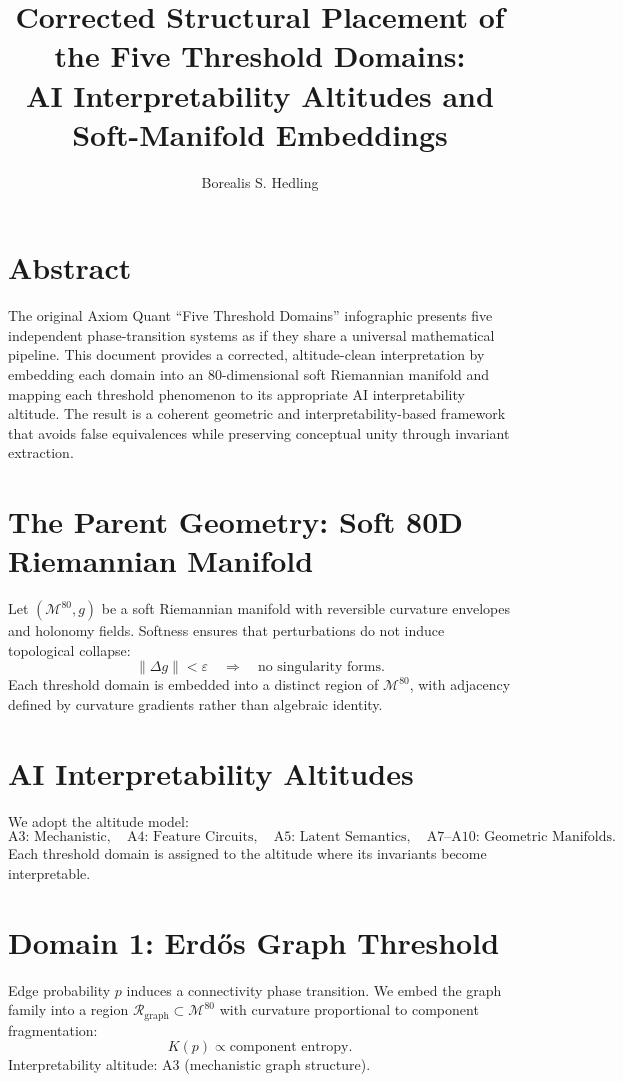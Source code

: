 \documentclass[11pt]{article}
\title{Corrected Structural Placement of the Five Threshold Domains:\\
AI Interpretability Altitudes and Soft-Manifold Embeddings}
\author{Borealis S. Hedling}
\date{}
\begin{document}
\maketitle

\section*{Abstract}
The original Axiom Quant ``Five Threshold Domains'' infographic presents five
independent phase-transition systems as if they share a universal mathematical
pipeline. This document provides a corrected, altitude-clean interpretation by
embedding each domain into an 80-dimensional soft Riemannian manifold and
mapping each threshold phenomenon to its appropriate AI interpretability
altitude. The result is a coherent geometric and interpretability-based
framework that avoids false equivalences while preserving conceptual unity
through invariant extraction.

\section{The Parent Geometry: Soft 80D Riemannian Manifold}
Let $(\mathcal{M}^{80}, g)$ be a soft Riemannian manifold with reversible
curvature envelopes and holonomy fields. Softness ensures that perturbations
do not induce topological collapse:
\[
\|\Delta g\| < \varepsilon \quad \Rightarrow \quad \text{no singularity forms}.
\]
Each threshold domain is embedded into a distinct region of $\mathcal{M}^{80}$,
with adjacency defined by curvature gradients rather than algebraic identity.

\section{AI Interpretability Altitudes}
We adopt the altitude model:
\[
\text{A3: Mechanistic},\quad
\text{A4: Feature Circuits},\quad
\text{A5: Latent Semantics},\quad
\text{A7--A10: Geometric Manifolds}.
\]
Each threshold domain is assigned to the altitude where its invariants become
interpretable.

\section{Domain 1: Erd\H{o}s Graph Threshold}
Edge probability $p$ induces a connectivity phase transition. We embed the
graph family into a region $\mathcal{R}_{\mathrm{graph}} \subset \mathcal{M}^{80}$
with curvature proportional to component fragmentation:
\[
K(p) \propto \text{component entropy}.
\]
Interpretability altitude: A3 (mechanistic graph structure).
\end{document}
